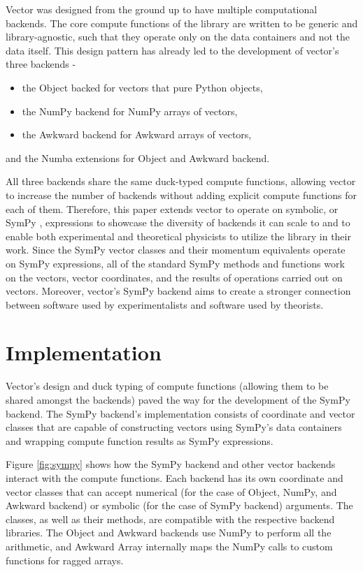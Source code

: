\documentclass{webofc}
\begin{document}
Vector was designed from the ground up to have multiple computational backends. The core compute functions of the library are written to be generic and library-agnostic, such that they operate only on the data containers and not the data itself. This design pattern has already led to the development of vector's three backends -

\begin{itemize}
    \item the Object backed for vectors that pure Python objects,
    \item the NumPy \cite{harris:2020} backend for NumPy arrays of vectors,
    \item the Awkward \cite{Pivarski:2018} backend for Awkward arrays of vectors,
\end{itemize}

and the Numba \cite{lam:2015} extensions for Object and Awkward backend.

All three backends share the same duck-typed compute functions, allowing vector to increase the number of backends without adding explicit compute functions for each of them. Therefore, this paper extends vector to operate on symbolic, or SymPy \cite{Meurer:2017}, expressions to showcase the diversity of backends it can scale to and to enable both experimental and theoretical physicists to utilize the library in their work. Since the SymPy vector classes and their momentum equivalents operate on SymPy expressions, all of the standard SymPy methods and functions work on the vectors, vector coordinates, and the results of operations carried out on vectors. Moreover, vector’s SymPy backend aims to create a stronger connection between software used by experimentalists and software used by theorists.

\section{Implementation}
\label{sec-implementation}

Vector's design and duck typing of compute functions (allowing them to be shared amongst the backends) paved the way for the development of the SymPy backend. The SymPy backend's implementation consists of coordinate and vector classes that are capable of constructing vectors using SymPy's data containers and wrapping compute function results as SymPy expressions.

Figure \ref{fig:sympy} shows how the SymPy backend and other vector backends interact with the compute functions. Each backend has its own coordinate and vector classes that can accept numerical (for the case of Object, NumPy, and Awkward backend) or symbolic (for the case of SymPy backend) arguments. The classes, as well as their methods, are compatible with the respective backend libraries. The Object and Awkward backends use NumPy to perform all the arithmetic, and Awkward Array internally maps the NumPy calls to custom functions for ragged arrays.
\end{document}
